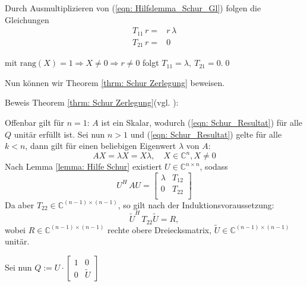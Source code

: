 \documentclass[a4paper,12pt]{report}
\newcommand{\C}{\mathbb C}
\newcommand{\rang}{\text{rang}}
\newcommand{\1}{\mathds{1}}
\theoremstyle{plain} %
\theoremstyle{definition} %
\theoremstyle{remark}
\begin{document}
                  
            Durch Ausmultiplizieren von (\ref{eqn: Hilfslemma_Schur_Gl}) folgen die Gleichungen\\

            $$\begin{aligned}
                  T_{11}\,r =& r\,\lambda\\
                  T_{21}\,r =& 0
            \end{aligned}$$

            mit $\rang(X)=1 \Rightarrow X\ne 0 \Rightarrow r\ne 0$ folgt $T_{11} = \lambda,\ T_{21} = 0$.\qed
            

            Nun können wir Theorem \ref{thrm: Schur Zerlegung} beweisen.


            Beweis Theorem \ref{thrm: Schur Zerlegung}(vgl. \cite[S. 313]{matrixGolub}):

            Offenbar gilt für $n=1$: $A$ ist ein Skalar, wodurch (\ref{eqn: Schur_Resultat}) für alle $Q$ unitär erfüllt ist.
            Sei nun $n>1$ und (\ref{eqn: Schur_Resultat}) gelte für alle $k<n$, dann gilt für einen beliebigen Eigenwert $\lambda$ von $A$:
            $$AX = \lambda X = X \lambda,\quad X\in \C^n, X\ne 0$$
            Nach Lemma \ref{lemma: Hilfe Schur} existiert $U\in \C^{n\times n}$, sodass
            $$U^H\, AU = \begin{bmatrix}
                  \lambda & T_{12} \\
                  0 & T_{22} \\
                  \end{bmatrix}$$
            Da aber $T_{22}\in\C^{(n-1)\times(n-1)}$, so gilt nach der Induktionsvoraussetzung:
            $$\widetilde U^H\,T_{22}\widetilde U = R,$$
            wobei $R\in\C^{(n-1)\times(n-1)}$  rechte obere Dreiecksmatrix, $\widetilde U \in\C^{(n-1)\times(n-1)}$ unitär.

            Sei nun $Q:=U\cdot\begin{bmatrix}
                  1&0\\
                  0&\widetilde U
            \end{bmatrix}$
\end{document}
